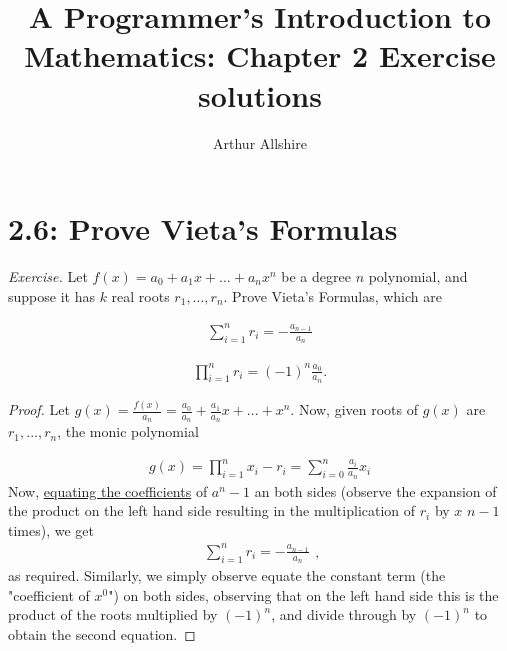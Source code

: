 \documentclass{article}
\author{Arthur Allshire}
\title{A Programmer's Introduction to Mathematics: Chapter 2 Exercise solutions}
\begin{document}
\maketitle

\section*{2.6: Prove Vieta's Formulas}
{\it Exercise.} Let $f(x) = a_0 + a_1x + ... + a_nx^n$ be a degree $n$ polynomial, and suppose
it has $k$ real roots $r_1, ..., r_n$. Prove Vieta's Formulas, which are

\[
\begin{aligned}
\displaystyle\sum_{i=1}^{n} r_i = -\frac{a_{n-1}}{a_n}
\end{aligned}
\]

\[
\begin{aligned}
\displaystyle\prod_{i=1}^{n} r_i = (-1)^n \frac{a_0}{a_n}.
\end{aligned}
\]

\begin{proof}

Let $g(x) = \frac{f(x)}{a_n} = \frac{a_0}{a_n} + \frac{a_1}{a_n}x + ... + x^n$.
Now, given roots of $g(x)$ are $r_1,...,r_n$, the monic polynomial

\[
\begin{aligned}
g(x) = \displaystyle\prod_{i=1}^{n} x_i - r_i = \displaystyle\sum_{i=0}^{n} \frac{a_i}{a_n} x_i
\end{aligned}
\]
Now, \href{https://en.wikipedia.org/wiki/Equating_coefficients}{equating the coefficients}
of $a^n-1$ an both sides (observe the expansion of the product on the left hand side resulting in
the multiplication of $r_i$ by $x$ $n-1$ times), we get
\[
\begin{aligned}
\displaystyle\sum_{i=1}^{n} r_i = -\frac{a_{n-1}}{a_n}
\end{aligned},
\]as required.
Similarly, we simply observe equate the constant term (the "coefficient of $x^0$") on both sides,
observing that on the left hand side this is the product of the roots multiplied by $(-1)^n$, and
divide through by $(-1)^n$ to obtain the second equation.

\end{proof}
\end{document}

